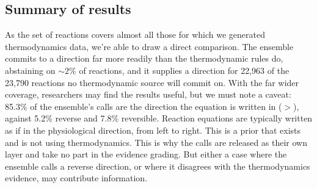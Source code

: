 \subsection{Summary of results} As the set of reactions covers almost all those for which we generated thermodynamics data, we're able to draw a direct comparison. The ensemble commits to a direction far more readily than the thermodynamic rules do, abstaining on $\sim2\%$ of reactions, and it supplies a direction for 22,963 of the 23,790 reactions no thermodynamic source will commit on. With the far wider coverage, researchers may find the results useful, but we must note a caveat: 85.3\% of the ensemble's calls are the direction the equation is written in ($>$), against 5.2\% reverse and 7.8\% reversible. Reaction equations are typically written as if in the physiological direction, from left to right. This is a prior that exists and is not using thermodynamics. This is why the calls are released as their own layer and take no part in the evidence grading. But either a case where the ensemble calls a reverse direction, or where it disagrees with the thermodynamics evidence, may contribute information.